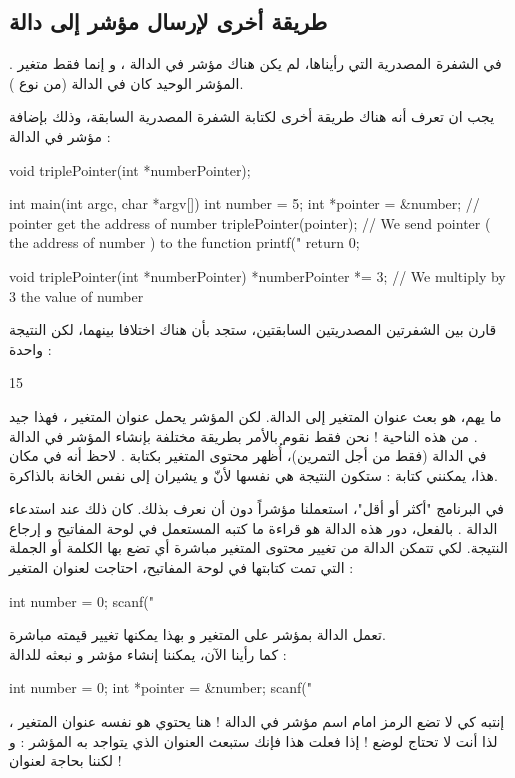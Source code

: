\subsection{طريقة أخرى لإرسال مؤشر إلى دالة}
في الشفرة المصدرية التي رأيناها، لم يكن هناك مؤشر في الدالة
،
و إنما فقط متغير
.
المؤشر الوحيد كان في الدالة
(من نوع
).

يجب ان تعرف أنه هناك طريقة أخرى لكتابة الشفرة المصدرية السابقة، وذلك بإضافة مؤشر في الدالة
 :
\begin{Csource}
void triplePointer(int *numberPointer);

int main(int argc, char *argv[])
{
	int number = 5;
	int *pointer = &number; // pointer get the address of number
	triplePointer(pointer); // We send pointer ( the address of number ) to the function
	printf("%
	return 0;
}

void triplePointer(int *numberPointer)
{
	*numberPointer *= 3; // We multiply by 3 the value of number
}
\end{Csource}
قارن بين الشفرتين المصدريتين السابقتين، ستجد بأن هناك اختلافا بينهما، لكن النتيجة واحدة :
\begin{Console}
15
\end{Console}
ما يهم، هو بعث عنوان المتغير
إلى الدالة. لكن المؤشر يحمل عنوان المتغير
،
فهذا جيد من هذه الناحية ! نحن فقط نقوم بالأمر بطريقة مختلفة بإنشاء المؤشر في الدالة
.\\
في الدالة
(فقط من أجل التمرين)، أُظهر محتوى المتغير
بكتابة
.
لاحظ أنه في مكان هذا، يمكنني كتابة
: ستكون النتيجة هي نفسها لأنّ
و
يشيران إلى نفس الخانة بالذاكرة.

في البرنامج "أكثر أو أقل"، استعملنا مؤشراً دون أن نعرف بذلك. كان ذلك عند استدعاء الدالة
.
بالفعل، دور هذه الدالة هو قراءة ما كتبه المستعمل في لوحة المفاتيح و إرجاع النتيجة. لكي تتمكن الدالة من تغيير محتوى المتغير مباشرة أي تضع بها الكلمة أو الجملة التي تمت كتابتها في لوحة المفاتيح، احتاجت لعنوان المتغير :
\begin{Csource}
int number = 0;
scanf("%
\end{Csource}
تعمل الدالة بمؤشر على المتغير
و بهذا يمكنها تغيير قيمته مباشرة.\\
كما رأينا الآن، يمكننا إنشاء مؤشر و نبعثه للدالة
 :
\begin{Csource}
int number = 0;
int *pointer = &number;
scanf("%
\end{Csource}
إنتبه كي لا تضع الرمز
\InlineCode{\&}
امام اسم مؤشر في الدالة
 !
هنا
يحتوي هو نفسه عنوان المتغير
،
لذا أنت لا تحتاج لوضع
\InlineCode{\&} !
إذا فعلت هذا فإنك ستبعث العنوان الذي يتواجد به المؤشر : و لكننا بحاجة لعنوان
 !

